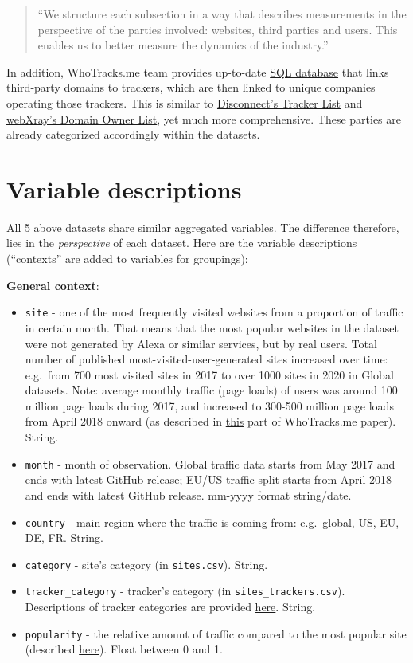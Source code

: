 \documentclass[
]{article}
\begin{document}
\begin{quote}
``We structure each subsection in a way that describes measurements in
the perspective of the parties involved: websites, third parties and
users. This enables us to better measure the dynamics of the industry.''
\end{quote}

In addition, WhoTracks.me team provides up-to-date
\href{https://t.ly/GYfw}{SQL database} that links third-party domains to
trackers, which are then linked to unique companies operating those
trackers. This is similar to \href{https://bit.ly/2ZylQRF}{Disconnect's
Tracker List} and \href{https://t.ly/EHuu}{webXray's Domain Owner List},
yet much more comprehensive. These parties are already categorized
accordingly within the datasets.

\hypertarget{variable-descriptions}{%
\section{Variable descriptions}\label{variable-descriptions}}

All 5 above datasets share similar aggregated variables. The difference
therefore, lies in the \emph{perspective} of each dataset. Here are the
variable descriptions (``contexts'' are added to variables for
groupings):

\textbf{General context}:

\begin{itemize}
\item
  \texttt{site} - one of the most frequently visited websites from a
  proportion of traffic in certain month. That means that the most
  popular websites in the dataset were not generated by Alexa or similar
  services, but by real users. Total number of published
  most-visited-user-generated sites increased over time: e.g.~from 700
  most visited sites in 2017 to over 1000 sites in 2020 in Global
  datasets. Note: average monthly traffic (page loads) of users was
  around 100 million page loads during 2017, and increased to 300-500
  million page loads from April 2018 onward (as described in
  \href{https://t.ly/J68v}{this} part of WhoTracks.me paper). String.
\item
  \texttt{month} - month of observation. Global traffic data starts from
  May 2017 and ends with latest GitHub release; EU/US traffic split
  starts from April 2018 and ends with latest GitHub release. mm-yyyy
  format string/date.
\item
  \texttt{country} - main region where the traffic is coming from:
  e.g.~global, US, EU, DE, FR. String.
\item
  \texttt{category} - site's category (in \texttt{sites.csv}). String.
\item
  \texttt{tracker\_category} - tracker's category (in
  \texttt{sites\_trackers.csv}). Descriptions of tracker categories are
  provided \href{https://bit.ly/2RQ56kk}{here}. String.
\item
  \texttt{popularity} - the relative amount of traffic compared to the
  most popular site (described \href{https://bit.ly/3bpBOAI}{here}).
  Float between 0 and 1.
\end{itemize}
\end{document}
